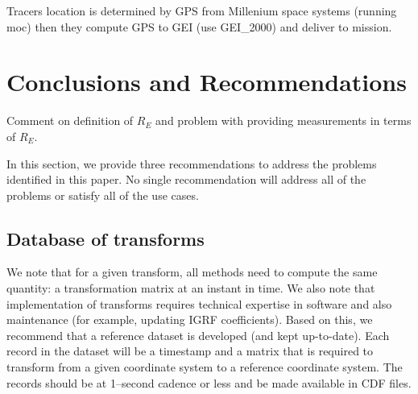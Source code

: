 \documentclass[draft]{agujournal2019}
\begin{document}




Tracers location is determined by GPS from Millenium space systems (running moc) then they compute GPS to GEI (use GEI_2000) and deliver to mission.

\section{Conclusions and Recommendations}
\label{sect:conclusions}

Comment on definition of $R_E$ and problem with providing measurements in terms of $R_E$.

In this section, we provide three recommendations to address the problems identified in this paper. No single recommendation will address all of the problems or satisfy all of the use cases.

\subsection{Database of transforms}

We note that for a given transform, all methods need to compute the same quantity: a transformation matrix at an instant in time. We also note that implementation of transforms requires technical expertise in software and also maintenance (for example, updating IGRF coefficients). Based on this, we recommend that a reference dataset is developed (and kept up-to-date). Each record in the dataset will be a timestamp and a matrix that is required to transform from a given coordinate system to a reference coordinate system. The records should be at 1--second cadence or less and be made available in CDF files.
\end{document}
